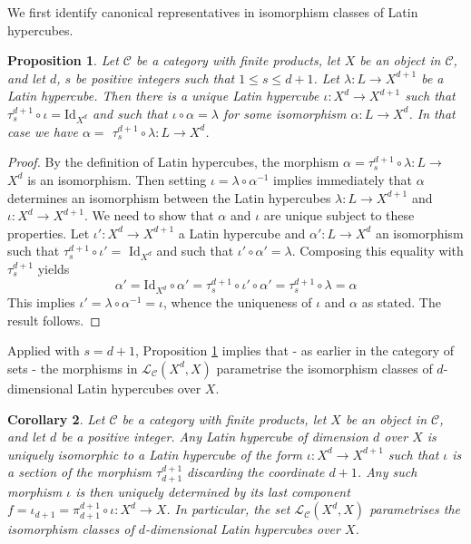 \documentclass{amsart} %
\theoremstyle{plain}\newtheorem{Theorem}{Theorem}[section]
\theoremstyle{plain}\newtheorem{Conjecture}[Theorem]{Conjecture}
\theoremstyle{plain}\newtheorem{Corollary}[Theorem]{Corollary}
\theoremstyle{plain}\newtheorem{Lemma}[Theorem]{Lemma}
\theoremstyle{plain}\newtheorem{Proposition}[Theorem]{Proposition}
\theoremstyle{definition}\newtheorem{Definition}[Theorem]{Definition}
\theoremstyle{definition}\newtheorem{Example}[Theorem]{Example}
\theoremstyle{definition}\newtheorem{Examples}[Theorem]{Examples}
\theoremstyle{definition}\newtheorem{Remark}[Theorem]{Remark}
\theoremstyle{definition}\newtheorem{Remarks}[Theorem]{Remarks}
\theoremstyle{plain}\newtheorem{Statement}[Theorem]{}
\def\CC{{\mathcal{C}}}    \def\OP{{\mathcal{O}P}}
\def\CL{{\mathcal{L}}}  \def\bCL{{\mathbf{L}}}
\def\Id{\mathrm{Id}}             \def\tenA{\otimes_A}
\begin{document}
We first identify canonical representatives in isomorphism classes of Latin hypercubes.

\begin{Proposition} \label{monoidalProp1}
Let $\CC$ be a category with finite products, let $X$ be an object in $\CC$, and
let $d$, $s$ be  positive integers such that $1\leq s\leq d+1$. 
Let $\lambda: L\to X^{d+1}$ be a Latin hypercube.
 Then there is a unique Latin hypercube $\iota : X^d \to X^{d+1}$ such that
$\tau^{d+1}_{s}\circ \iota = \Id_{X^d}$ and such that 
$\iota\circ\alpha=\lambda$ for some isomorphism $\alpha : L \to X^d$.
In that case we have  $\alpha = $ $\tau^{d+1}_{s}\circ \lambda :  L \to X^d$. 
\end{Proposition}

\begin{proof}
By the definition of Latin hypercubes, the morphism 
$\alpha = \tau^{d+1}_{s}\circ \lambda : L\to$ $X^d$ is an isomorphism. 
Then setting $\iota = \lambda\circ \alpha^{-1}$ implies immediately that $\alpha$
determines an isomorphism between the Latin hypercubes $\lambda : L\to X^{d+1}$
and $\iota : X^d\to X^{d+1}$. We need to show that $\alpha$ and $\iota$  are
unique subject to these properties. Let $\iota' : X^d\to X^{d+1}$ a Latin hypercube
and $\alpha' : L\to X^d$ an isomorphism such that $\tau^{d+1}_{s}\circ\iota'=$
$\Id_{X^d}$ and such that $\iota'\circ\alpha'= \lambda$. Composing this
equality with $\tau^{d+1}_{s}$ yields 
$$\alpha' = \Id_{X^d}\circ\alpha' = \tau^{d+1}_{s}\circ\iota'\circ \alpha'
= \tau^{d+1}_{s}\circ \lambda = \alpha$$
This implies $\iota'=\lambda\circ\alpha^{-1}=\iota$, whence the uniqueness of $\iota$ 
and $\alpha$ as stated. The result follows.
\end{proof}


Applied with $s=d+1$, Proposition \ref{monoidalProp1} implies that  -  as 
earlier in the category of sets - the  morphisms in $\CL_\CC(X^d,X)$
parametrise the isomorphism classes of $d$-dimensional Latin hypercubes over $X$.

\begin{Corollary} \label{monoidalCor1}
Let $\CC$ be a category with finite products, let $X$ be an object in $\CC$, and
let $d$ be a positive integer. Any Latin hypercube of dimension $d$ over $X$ is
uniquely isomorphic to  a Latin hypercube of the form $\iota : X^d\to X^{d+1}$ 
such that $\iota$ is a section of the morphism $\tau^{d+1}_{d+1}$ discarding the 
coordinate $d+1$. Any such morphism  $\iota$ is then uniquely determined by
its last component $f = \iota_{d+1} = \pi^{d+1}_{d+1}\circ\iota  : X^d\to X$.
In particular, the set $\CL_\CC(X^d,X)$ 
parametrises the  isomorphism classes of $d$-dimensional Latin hypercubes over $X$.
\end{Corollary}
\end{document}
